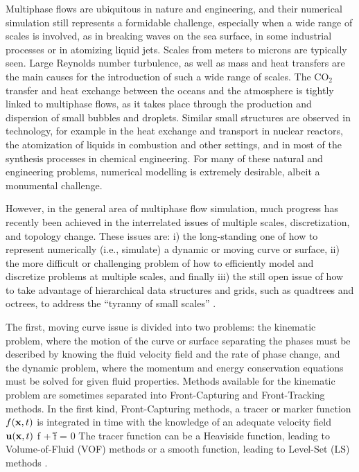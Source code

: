 Multiphase flows are ubiquitous in nature and engineering, and their numerical simulation still represents a formidable challenge, especially when a wide range of scales is involved, as in breaking waves on the sea surface, in some industrial processes or in atomizing liquid jets. Scales from meters to microns are typically seen. 
%
% 
Large Reynolds number turbulence, as well as mass and heat transfers
are the main causes for the introduction of such a wide range of scales.
The CO$_2$ transfer and heat exchange between the oceans and the atmosphere is tightly linked to multiphase flows,
as it takes place through the production and dispersion of small bubbles and droplets.
%
Similar small structures are observed in technology, for example in the heat exchange and transport 
in nuclear reactors, the atomization of liquids in combustion and other settings, and in most of the synthesis processes in chemical engineering. For many of these natural and engineering problems, numerical modelling is extremely desirable, albeit a monumental challenge. 

However, in the general area of multiphase flow simulation, much progress has recently been achieved in the interrelated issues of multiple scales, discretization, and topology change. These issues are: i) the long-standing one of how to represent numerically (i.e., simulate) a dynamic or moving curve or surface, ii) the more difficult or challenging problem of how to efficiently model and discretize problems at multiple scales, and finally iii) the still open issue of how to take advantage of hierarchical data structures and grids, such as quadtrees and octrees, to address the ``tyranny of small scales'' \cite{or2018tyranny}. 

The first, moving curve issue is divided into two problems: the kinematic problem, where the motion of the curve or surface separating the phases must be described by knowing the fluid velocity field and the rate of phase change, and the dynamic problem, where the momentum and energy conservation equations must be solved for given fluid properties. Methods available for the kinematic problem are sometimes separated into Front-Capturing and Front-Tracking methods. In the first kind, Front-Capturing methods, a tracer or marker function $f({\bf x},t)$ is integrated in time with the knowledge of an adequate velocity field
${\bf u}({\bf x},t)$
\be
\dert f + \U \cdot \nabla f = 0
\nd
The tracer function can be a Heaviside function, leading to Volume-of-Fluid (VOF) methods \cite{Hirt_1981_39, Brackbill_1992_100} or a smooth function, leading to Level-Set (LS) methods \cite{Osher_1988_79, Osher_2001_169}.

